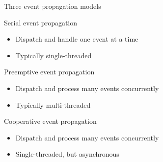 \documentclass{beamer}
\begin{document}
    \begin{frame}{Three event propagation models}

        \begin{block}{Serial event propagation}

            \begin{itemize}
                \item Dispatch and handle one event at a time
                \item Typically single-threaded
            \end{itemize}
        \end{block}

        \begin{block}{Preemptive event propagation}

            \begin{itemize}
                \item Dispatch and process many events concurrently
                \item Typically multi-threaded
            \end{itemize}
        \end{block}

        \begin{block}{Cooperative event propagation}

            \begin{itemize}
                \item Dispatch and process many events concurrently
                \item Single-threaded, but asynchronous
            \end{itemize}
        \end{block}

    \end{frame}
\end{document}
